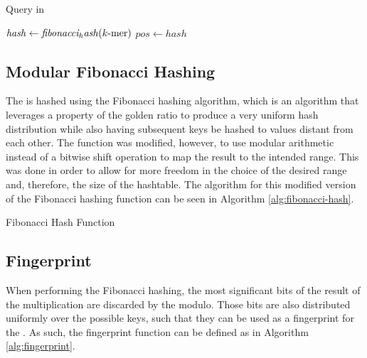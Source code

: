 \begin{algorithm}
  \caption{Query \kmer in \dBHT}\label{alg:ht-query}
  $\mathit{hash} \gets \mathit{fibonacci_hash}(\mbox{$k$-mer})$\;
  $\mathit{pos} \gets \mathit{hash}$\;
\end{algorithm}

\subsection{Modular Fibonacci Hashing}

The \kmer is hashed using the Fibonacci hashing algorithm, which is an algorithm that leverages a property of the golden ratio
to produce a very uniform hash distribution while also having subsequent keys be hashed to values distant from each other. The
function was modified, however, to use modular arithmetic instead of a bitwise shift operation to map the result to the intended
range. This was done in order to allow for more freedom in the choice of the desired range and, therefore, the size of the
hashtable. The algorithm for this modified version of the Fibonacci hashing function can be seen in Algorithm \ref{alg:fibonacci-hash}.

\begin{algorithm}
  \caption{Fibonacci Hash Function}\label{alg:fibonacci-hash}
\end{algorithm}

\subsection{Fingerprint}

When performing the Fibonacci hashing, the most significant bits of the result of the multiplication are discarded by the modulo.
Those bits are also distributed uniformly over the possible keys, such that they can be used as a fingerprint for the \kmer.
As such, the fingerprint function can be defined as in Algorithm \ref{alg:fingerprint}. 

